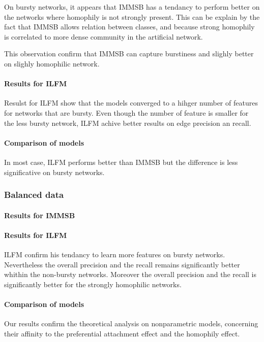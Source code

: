 On bursty networks, it appears that IMMSB has a tendancy to perform better on the networks where homophily is not strongly present. This can be explain by the fact that IMMSB allows relation between classes, and because strong homophily is correlated to more dense community in the artificial network.


This observation confirm that IMMSB can capture burstiness and slighly better on slighly homophilic network.

\paragraph{Results for ILFM}
Resulst for ILFM show that the models converged to a hihger number of features for networks that are bursty. Even though the number of feature is smaller for the less bursty network, ILFM achive better  results on edge precision an recall.

\paragraph{Comparison of models}
In most case, ILFM performs better than IMMSB but the difference is less significative on bursty networks.

\subsubsection{Balanced data}
\paragraph{Results for IMMSB}

\paragraph{Results for ILFM}
ILFM confirm his tendancy to learn more features on bursty networks. Nevertheless the overall precision and the recall remains significantly better whithin the non-bursty networks. Moreover the overall precision and the recall is significantly better for the strongly homophilic networks.

\paragraph{Comparison of models}


Our results confirm the theoretical analysis on nonparametric models, concerning their affinity to the preferential attachment effect and the homophily effect.

